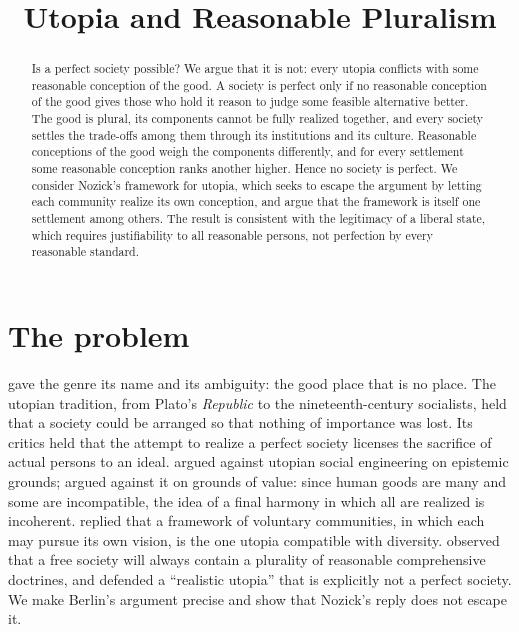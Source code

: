 \documentclass{situationist-preprint}
\title{Utopia and Reasonable Pluralism}
\begin{document}
\maketitle

\begin{abstract}
Is a perfect society possible? We argue that it is not: every utopia conflicts with some reasonable conception of the good. A society is perfect only if no reasonable conception of the good gives those who hold it reason to judge some feasible alternative better. The good is plural, its components cannot be fully realized together, and every society settles the trade-offs among them through its institutions and its culture. Reasonable conceptions of the good weigh the components differently, and for every settlement some reasonable conception ranks another higher. Hence no society is perfect. We consider Nozick's framework for utopia, which seeks to escape the argument by letting each community realize its own conception, and argue that the framework is itself one settlement among others. The result is consistent with the legitimacy of a liberal state, which requires justifiability to all reasonable persons, not perfection by every reasonable standard.
\end{abstract}

\section{The problem}

\citet{More1516} gave the genre its name and its ambiguity: the good place that is no place. The utopian tradition, from Plato's \emph{Republic} to the nineteenth-century socialists, held that a society could be arranged so that nothing of importance was lost. Its critics held that the attempt to realize a perfect society licenses the sacrifice of actual persons to an ideal. \citet{Popper1945} argued against utopian social engineering on epistemic grounds; \citet{Berlin1958,Berlin1990} argued against it on grounds of value: since human goods are many and some are incompatible, the idea of a final harmony in which all are realized is incoherent. \citet[Part~III]{Nozick1974} replied that a framework of voluntary communities, in which each may pursue its own vision, is the one utopia compatible with diversity. \citet{Rawls1993} observed that a free society will always contain a plurality of reasonable comprehensive doctrines, and \citet{Rawls1999} defended a \enquote{realistic utopia} that is explicitly not a perfect society. We make Berlin's argument precise and show that Nozick's reply does not escape it.
\end{document}
